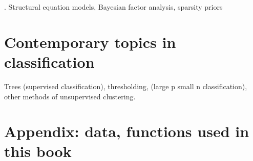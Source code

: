 \documentclass[12pt]{tufte-book}
\begin{document}
.   Structural equation models, 
Bayesian factor analysis, sparsity priors










\chapter{Contemporary topics in classification}
\label{modernclassification}

   Trees (supervised classification), 
thresholding, (large p small n classification), other methods of unsupervised clustering.


\appendix




\chapter{Appendix: data, functions used in this book}





\printindex
\end{document}
